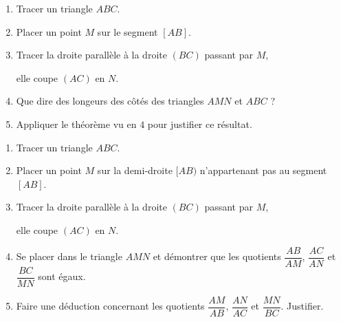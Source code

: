 \begin{activite}
        \begin{minipage}{0.6\textwidth}
            \begin{enumerate}
                \item Tracer un triangle $ABC$.
                \item Placer un point $M$ sur le segment $[AB]$.
                \item Tracer la droite parallèle à la droite $(BC)$ passant par $M$,
                
                elle coupe $(AC)$ en $N$.
                \item Que dire des longeurs des côtés des triangles $AMN$ et $ABC$ ?
                \item Appliquer le théorème vu en $4$ pour justifier ce résultat.
            \end{enumerate}
        \end{minipage}
        \hspace*{1cm}
        \begin{minipage}{0.4\textwidth}
        \end{minipage}

        \partie[Configuration emboîtée - {$M \in [AB)$ ; $M \notin [AB]$}]
        \begin{minipage}{0.6\textwidth}
            \begin{enumerate}
                \item Tracer un triangle $ABC$.
                \item Placer un point $M$ sur la demi-droite $[AB)$ n'appartenant pas au segment $[AB]$.
                \item Tracer la droite parallèle à la droite $(BC)$ passant par $M$,
                
                elle coupe $(AC)$ en $N$.
                \item Se placer dans le triangle $AMN$ et démontrer que les quotients
                $\dfrac{AB}{AM}$, $\dfrac{AC}{AN}$ et $\dfrac{BC}{MN}$ sont égaux.
                \item Faire une déduction concernant les quotients $\dfrac{AM}{AB}$, $\dfrac{AN}{AC}$ et $\dfrac{MN}{BC}$. Justifier.
            \end{enumerate}
        \end{minipage}
        \hspace*{1cm}
        \begin{minipage}{0.4\textwidth}
        \end{minipage}


\end{activite}
